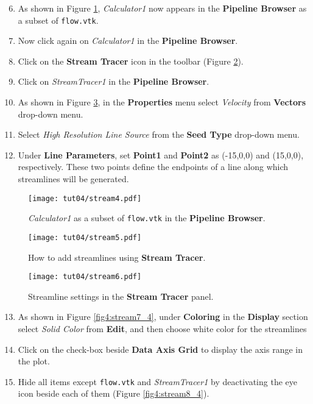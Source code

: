 \begin{enumerate}[label=\arabic*)]
	\setcounter{enumi}{5}
	\item As shown in Figure \ref{fig4:stream4_4}, \textit{Calculator1} now appears in the \textbf{Pipeline Browser} as a subset of \texttt{flow.vtk}.
	\item Now click again on \textit{Calculator1} in the \textbf{Pipeline Browser}.
	\item Click on the \textbf{Stream Tracer} icon in the toolbar (Figure \ref{fig4:stream5_4}).
	\item Click on \textit{StreamTracer1} in the \textbf{Pipeline Browser}.
	\item As shown in Figure \ref{fig4:stream6_4}, in the \textbf{Properties} menu select \textit{Velocity} from \textbf{Vectors} drop-down menu.
	\item Select \textit{High Resolution Line Source} from the \textbf{Seed Type} drop-down menu.
	\item Under \textbf{Line Parameters}, set \textbf{Point1} and \textbf{Point2} as (-15,0,0) and (15,0,0), respectively. These two points define the endpoints of a line along which streamlines will be generated.
\end{enumerate} 
\begin{figure}[ht]
    \centering
    \texttt{[image: tut04/stream4.pdf]}
    \caption{\textit{Calculator1} as a subset of \texttt{flow.vtk} in the \textbf{Pipeline Browser}.}
    \label{fig4:stream4_4}
\end{figure}
\begin{figure}[ht]
    \centering
    \texttt{[image: tut04/stream5.pdf]}
    \caption{How to add streamlines using \textbf{Stream Tracer}.}
    \label{fig4:stream5_4}
\end{figure}
\begin{figure}[ht]
    \centering
    \texttt{[image: tut04/stream6.pdf]}
    \caption{Streamline settings in the \textbf{Stream Tracer} panel.}
    \label{fig4:stream6_4}
\end{figure}
\begin{enumerate}[label=\arabic*)]
	\setcounter{enumi}{12}
	\item As shown in Figure \ref{fig4:stream7_4}, under \textbf{Coloring} in the \textbf{Display} section select \textit{Solid Color} from \textbf{Edit}, and then choose white color for the streamlines
	\item Click on the check-box beside \textbf{Data Axis Grid} to display the axis range in the plot.
	\item Hide all items except \texttt{flow.vtk} and \textit{StreamTracer1} by deactivating the eye icon beside each of them (Figure \ref{fig4:stream8_4}).
\end{enumerate} 
